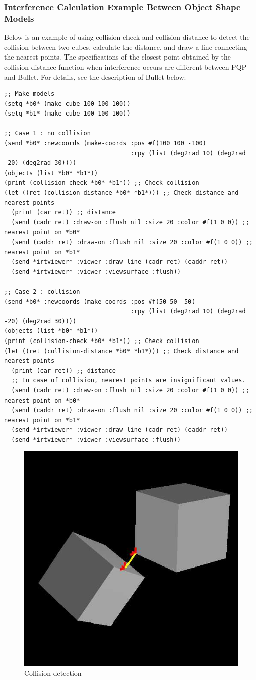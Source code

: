 \subsubsection{Interference Calculation Example Between Object Shape Models}
Below is an example of using collision-check and collision-distance to detect the collision between two cubes, calculate the distance, and draw a line connecting the nearest points. The specifications of the closest point obtained by the collision-distance function when interference occurs are different between PQP and Bullet. For details, see the description of Bullet below:
{\baselineskip=10pt
\begin{verbatim}
;; Make models
(setq *b0* (make-cube 100 100 100))
(setq *b1* (make-cube 100 100 100))

;; Case 1 : no collision
(send *b0* :newcoords (make-coords :pos #f(100 100 -100)
                                   :rpy (list (deg2rad 10) (deg2rad -20) (deg2rad 30))))
(objects (list *b0* *b1*))
(print (collision-check *b0* *b1*)) ;; Check collision
(let ((ret (collision-distance *b0* *b1*))) ;; Check distance and nearest points
  (print (car ret)) ;; distance
  (send (cadr ret) :draw-on :flush nil :size 20 :color #f(1 0 0)) ;; nearest point on *b0*
  (send (caddr ret) :draw-on :flush nil :size 20 :color #f(1 0 0)) ;; nearest point on *b1*
  (send *irtviewer* :viewer :draw-line (cadr ret) (caddr ret))
  (send *irtviewer* :viewer :viewsurface :flush))

;; Case 2 : collision
(send *b0* :newcoords (make-coords :pos #f(50 50 -50)
                                   :rpy (list (deg2rad 10) (deg2rad -20) (deg2rad 30))))
(objects (list *b0* *b1*))
(print (collision-check *b0* *b1*)) ;; Check collision
(let ((ret (collision-distance *b0* *b1*))) ;; Check distance and nearest points
  (print (car ret)) ;; distance
  ;; In case of collision, nearest points are insignificant values.
  (send (cadr ret) :draw-on :flush nil :size 20 :color #f(1 0 0)) ;; nearest point on *b0*
  (send (caddr ret) :draw-on :flush nil :size 20 :color #f(1 0 0)) ;; nearest point on *b1*
  (send *irtviewer* :viewer :draw-line (cadr ret) (caddr ret))
  (send *irtviewer* :viewer :viewsurface :flush))
\end{verbatim}
}

\begin{figure}[htb]
  \begin{center}
    \includegraphics[width=0.50\columnwidth]{fig/collision.jpg}
    \caption{Collision detection}
  \end{center}
\end{figure}


